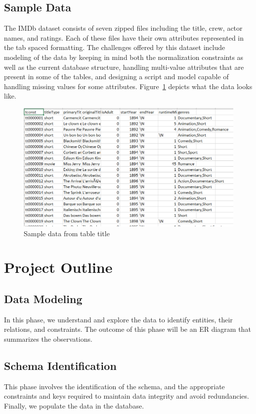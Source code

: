 \documentclass{sig-alternate}
\begin{document}
\subsection{Sample Data}
The IMDb dataset consists of seven zipped files including the title, crew, actor names, and ratings. Each of these files have their own attributes represented in the tab spaced formatting. The challenges offered by this dataset include modeling of the data by keeping in mind both the normalization constraints as well as the current database structure, handling multi-value attributes that are present in some of the tables, and designing a script and model capable of handling missing values for some attributes. Figure~\ref{sample} depicts what the data looks like.
\begin{figure}
	\includegraphics[width = \linewidth]{sample.png}
	\caption{Sample data from table title}
	\label{sample}
\end{figure}
\section{Project Outline}
\subsection{Data Modeling}
In this phase, we understand and explore the data to identify entities, their relations, and constraints. The outcome of this phase will be an  ER diagram that summarizes the observations.
\subsection{Schema Identification}
This phase involves the identification of the schema, and the appropriate constraints and keys required to maintain data integrity and avoid redundancies. Finally, we populate the data in the database.
\end{document}
